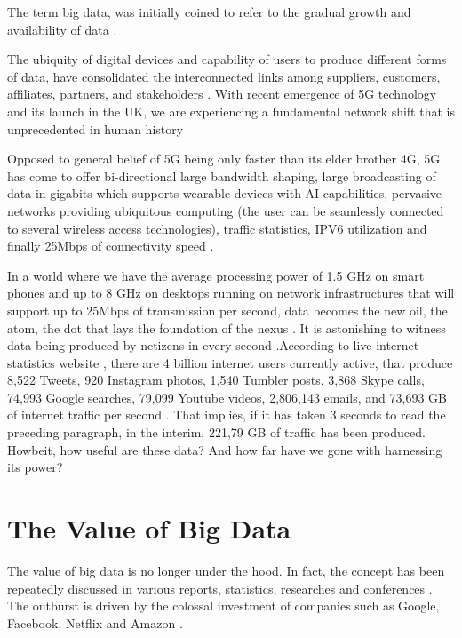 The term big data, was initially coined to refer to the gradual growth and availability of data \cite{lycett2013datafication}.

The ubiquity of digital devices and capability of users to produce different forms of data, have consolidated the interconnected links among suppliers, customers, affiliates, partners, and stakeholders \cite{Bughin2016}. With recent emergence of 5G technology and its launch in the UK, we are experiencing a fundamental network shift that is unprecedented in human history \cite{ahmad20205g}

Opposed to general belief of 5G being only faster than its elder brother 4G, 5G has come to offer bi-directional large bandwidth shaping, large broadcasting of data in gigabits which supports wearable devices with AI capabilities, pervasive networks providing ubiquitous computing (the user can be seamlessly connected to several wireless access technologies), traffic statistics, IPV6 utilization and finally 25Mbps of connectivity speed \cite{Gohil2013}.

In a world where we have the average processing power of 1.5 GHz on smart phones and up to 8 GHz on desktops running on network infrastructures that will support up to 25Mbps of transmission per second, data becomes the new oil, the atom, the dot that lays the foundation of the nexus \cite{Rad2017}. It is astonishing to witness data being produced by netizens in every second .According to live internet statistics website , there are 4 billion internet users currently active, that produce 8,522 Tweets, 920 Instagram photos, 1,540 Tumbler posts, 3,868 Skype calls, 74,993 Google searches, 79,099 Youtube videos, 2,806,143 emails, and 73,693 GB of internet traffic per second \cite{Stats2017}. That implies, if it has taken 3 seconds to read the preceding paragraph, in the interim, 221,79 GB of traffic has been produced. Howbeit, how useful are these data? And how far have we gone with harnessing its power?


\section{The Value of Big Data}

The value of big data is no longer under the hood. In fact, the concept has been repeatedly discussed in various reports, statistics, researches and conferences \cite{Chen2012}. The outburst is driven by the colossal investment of companies such as Google, Facebook, Netflix and Amazon \cite{Rada2017}.

